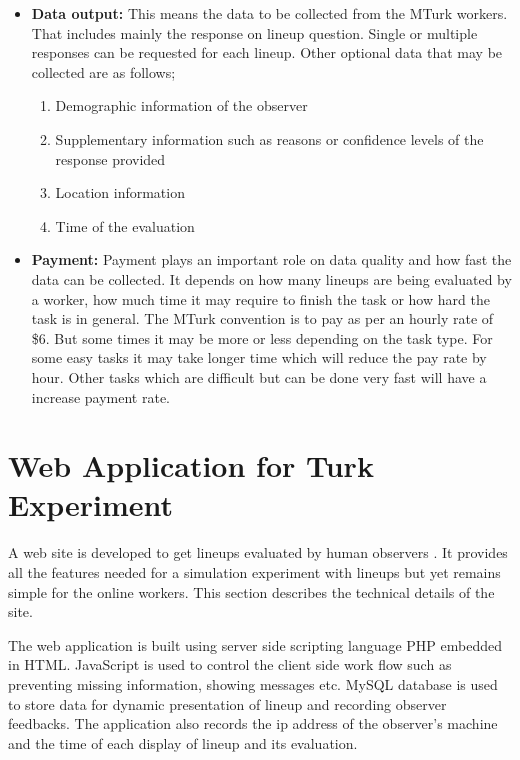 \documentclass[11pt]{article}
\begin{document}
\begin{itemize}
\item {\bf Data output:} This means the data to be collected from the MTurk workers. That includes mainly the response on lineup question. Single or multiple responses can be requested for each lineup. Other optional data that may be collected are as follows;

\begin{enumerate}
\item Demographic information of the observer
\item Supplementary information such as reasons or confidence levels of the response provided
\item Location information
\item Time of the evaluation
\end{enumerate}

\item {\bf Payment:} Payment plays an important role on data quality and how fast the data can be collected. It depends on how many lineups are being evaluated by a worker, how much time it may require to finish the task or how hard the task is in general. The MTurk convention is to pay as per an hourly rate of \$6. But some times it may be more or less depending on the task type. For some easy tasks it may take longer time which will reduce the pay rate by hour. Other tasks which are difficult but can be done very fast will have a increase payment rate.

%
%
%
%
%
%

\end{itemize}


\section{Web Application for Turk Experiment} \label{sec:web_application}

A web site is developed to get lineups evaluated by human observers \citep{majumder:turk}. It provides all the features needed for a simulation experiment with lineups but yet remains simple for the online workers. This section describes the technical details of the site. 

The web application is built using server side scripting language PHP embedded in HTML. JavaScript is used to control the client side work flow such as preventing missing information, showing messages etc. MySQL database is used to store data for dynamic presentation of lineup and recording observer feedbacks. The application also records the ip address of the observer's machine and the time of each display of lineup and its evaluation.  
\end{document}

